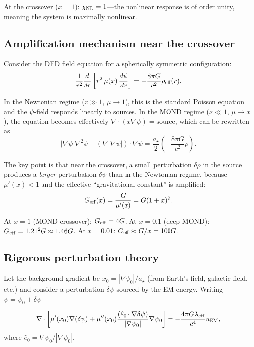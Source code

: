 \documentclass[12pt,aps,prd,twocolumn,superscriptaddress,nofootinbib]{revtex4-2}
\newcommand{\astar}{a_\star}
\newcommand{\lam}{\lambda}
\begin{document}
At the crossover ($x = 1$): $\chi_{\rm NL} = 1$---the nonlinear
response is of order unity, meaning the system is maximally nonlinear.

\subsection{Amplification mechanism near the crossover}
\label{sec:amplification-mechanism}

Consider the DFD field equation for a spherically symmetric
configuration:
\begin{equation}\label{eq:spherical}
\frac{1}{r^2}\frac{d}{dr}\left[r^2\,\mu(x)\,\frac{d\psi}{dr}\right]
= -\frac{8\pi G}{c^2}\rho_{\rm eff}(r).
\end{equation}

In the Newtonian regime ($x \gg 1$, $\mu \to 1$), this is
the standard Poisson equation and the $\psi$-field responds
linearly to sources. In the MOND regime ($x \ll 1$, $\mu \to x$),
the equation becomes effectively $\nabla\cdot(x\nabla\psi) = \text{source}$,
which can be rewritten as
\begin{equation}
|\nabla\psi|\nabla^2\psi + (\nabla|\nabla\psi|)\cdot\nabla\psi
= \frac{\astar}{2}\left(-\frac{8\pi G}{c^2}\rho\right).
\end{equation}

The key point is that near the crossover, a small perturbation
$\delta\rho$ in the source produces a \emph{larger} perturbation
$\delta\psi$ than in the Newtonian regime, because $\mu'(x) < 1$
and the effective ``gravitational constant'' is amplified:
\begin{equation}\label{eq:Geff}
G_{\rm eff}(x) = \frac{G}{\mu'(x)} = G(1+x)^2.
\end{equation}

At $x = 1$ (MOND crossover): $G_{\rm eff} = 4G$.
At $x = 0.1$ (deep MOND): $G_{\rm eff} = 1.21^2 G \approx 1.46G$.
At $x = 0.01$: $G_{\rm eff} \approx G/x = 100G$.

\subsection{Rigorous perturbation theory}
\label{sec:perturbation}

Let the background gradient be $x_0 = |\nabla\psi_0|/\astar$
(from Earth's field, galactic field, etc.) and consider a perturbation
$\delta\psi$ sourced by the EM energy. Writing
$\psi = \psi_0 + \delta\psi$:

\begin{equation}\label{eq:linearized-field}
\nabla\cdot\left[\mu'(x_0)\nabla(\delta\psi)
+ \mu''(x_0)\frac{(\hat{e}_0\cdot\nabla\delta\psi)}{|\nabla\psi_0|}
\nabla\psi_0\right]
= -\frac{4\pi G\lam_{\rm eff}}{c^4}u_{\rm EM},
\end{equation}
where $\hat{e}_0 = \nabla\psi_0/|\nabla\psi_0|$.
\end{document}
